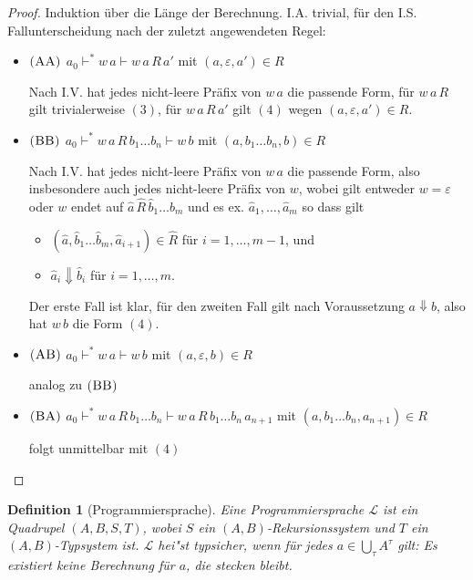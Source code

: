 \documentclass[12pt,a2paper,draft]{article}
\newcommand{\rn}[1]{\mbox{\ensuremath{\textsc{(#1)}}}}
\newtheorem{definition}{Definition}
\begin{document}
\begin{proof}
  Induktion \"uber die L\"ange der Berechnung. I.A. trivial, f\"ur den
  I.S. Fallunterscheidung nach der zuletzt angewendeten Regel:
  \begin{itemize}
  \item \rn{AA} $a_0 \vdash^* w\,a \vdash w\,a\,R\,a'$ mit $(a,\varepsilon,a') \in R$
    
    Nach I.V. hat jedes nicht-leere Pr\"afix von $w\,a$ die passende Form, f\"ur $w\,a\,R$
    gilt trivialerweise $(3)$, f\"ur $w\,a\,R\,a'$ gilt $(4)$ wegen $(a,\varepsilon,a') \in R$.

  \item \rn{BB} $a_0 \vdash^* w\,a\,R\,b_1 \ldots b_n \vdash w\,b$ mit $(a,b_1 \ldots b_n,b) \in R$

    Nach I.V. hat jedes nicht-leere Pr\"afix von $w\,a$ die passende Form, also insbesondere auch
    jedes nicht-leere Pr\"afix von $w$, wobei gilt entweder $w = \varepsilon$ oder $w$ endet
    auf $\hat{a}\,\hat{R}\,\hat{b}_1 \ldots \hat{b}_m$ und es ex. $\hat{a}_1,\ldots,\hat{a}_m$
    so dass gilt
    \begin{itemize}
    \item $(\hat{a},\hat{b}_1 \ldots \hat{b}_m,\hat{a}_{i+1}) \in \hat{R}$ f\"ur $i=1,\ldots,m-1$, und
    \item $\hat{a}_i \Downarrow \hat{b}_i$ f\"ur $i=1,\ldots,m$.
    \end{itemize}
    Der erste Fall ist klar, f\"ur den zweiten Fall gilt nach Voraussetzung $a \Downarrow b$,
    also hat $w\,b$ die Form $(4)$.

  \item \rn{AB} $a_0 \vdash^* w\,a \vdash w\,b$ mit $(a,\varepsilon,b) \in R$

    analog zu \rn{BB}

  \item \rn{BA} $a_0 \vdash^* w\,a\,R\,b_1 \ldots b_n \vdash w\,a\,R\,b_1 \ldots b_n\,a_{n+1}$
    mit $(a,b_1 \ldots b_n,a_{n+1}) \in R$

    folgt unmittelbar mit $(4)$
  \end{itemize}
\end{proof}

\begin{definition}[Programmiersprache]
  Eine \emph{Programmiersprache} $\mathcal{L}$ ist ein Quadrupel $(A,B,S,T)$, wobei $S$ ein
  $(A,B)$-Rekursionssystem und $T$ ein $(A,B)$-Typsystem ist. $\mathcal{L}$ hei"st \emph{typsicher},
  wenn f\"ur jedes $a \in \bigcup_{\tau}A^\tau$ gilt: Es existiert keine Berechnung f\"ur $a$,
  die stecken bleibt.
\end{definition}
\end{document}
